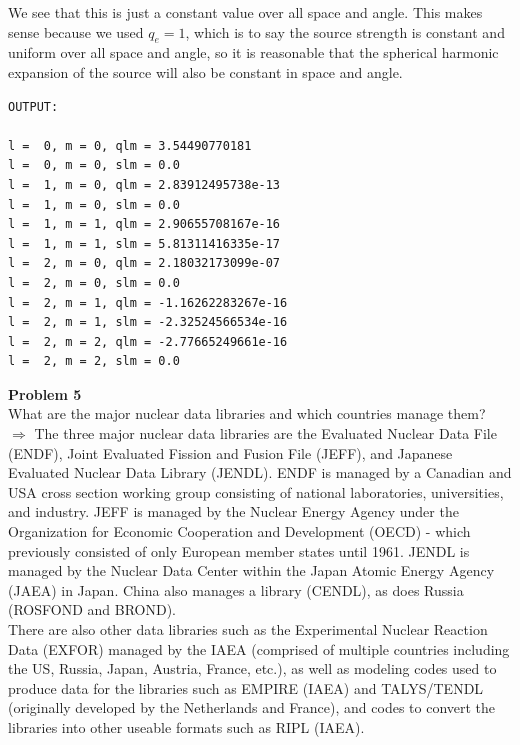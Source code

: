 \documentclass[10pt]{article}
\begin{document}
We see that this is just a constant value over all space and angle. This makes sense because we used $q_e = 1$, which is to say the source strength is constant and uniform over all space and angle, so it is reasonable that the spherical harmonic expansion of the source will also be constant in space and angle.\\




\begin{lstlisting}[numbers=none]
OUTPUT:

l =  0, m = 0, qlm = 3.54490770181
l =  0, m = 0, slm = 0.0
l =  1, m = 0, qlm = 2.83912495738e-13
l =  1, m = 0, slm = 0.0
l =  1, m = 1, qlm = 2.90655708167e-16
l =  1, m = 1, slm = 5.81311416335e-17
l =  2, m = 0, qlm = 2.18032173099e-07
l =  2, m = 0, slm = 0.0
l =  2, m = 1, qlm = -1.16262283267e-16
l =  2, m = 1, slm = -2.32524566534e-16
l =  2, m = 2, qlm = -2.77665249661e-16
l =  2, m = 2, slm = 0.0
\end{lstlisting}






\newpage
\noindent \textbf{Problem 5}\\
What are the major nuclear data libraries and which countries manage them?\\[5pt]

$\Rightarrow$ The three major nuclear data libraries are the Evaluated Nuclear Data File (ENDF), Joint Evaluated Fission and Fusion File (JEFF), and Japanese Evaluated Nuclear Data Library (JENDL). ENDF is managed by a Canadian and USA cross section working group consisting of national laboratories, universities, and industry. JEFF is managed by the Nuclear Energy Agency under the Organization for Economic Cooperation and Development (OECD) - which previously consisted of only European member states until 1961. JENDL is managed by the Nuclear Data Center within the Japan Atomic Energy Agency (JAEA) in Japan. China also manages a library (CENDL), as does Russia (ROSFOND and BROND).\\

There are also other data libraries such as the Experimental Nuclear Reaction Data (EXFOR) managed by the IAEA (comprised of multiple countries including the US, Russia, Japan, Austria, France, etc.), as well as modeling codes used to produce data for the libraries such as EMPIRE (IAEA) and TALYS/TENDL (originally developed by the Netherlands and France), and codes to convert the libraries into other useable formats such as RIPL (IAEA).
\end{document}
